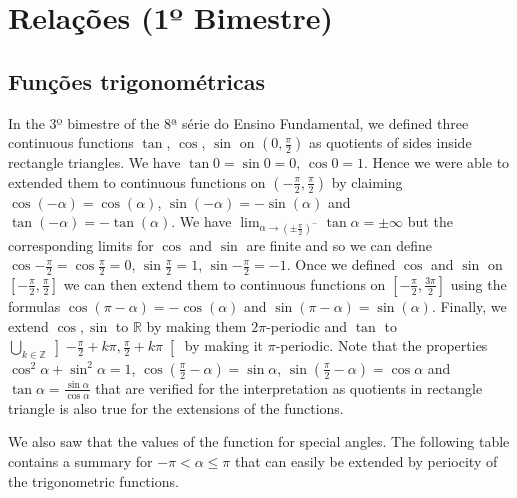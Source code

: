 \chapter{Relações (1º Bimestre)}

\section{Funções trigonométricas}

In the 3º bimestre of the 8ª série do Ensino Fundamental, we defined three
continuous functions $\tan$, $\cos$, $\sin$ on $(0,\frac{\pi}{2})$ as quotients
of sides inside rectangle triangles. We have ${\tan 0} = {\sin 0} = 0$,
${\cos 0} = 1$. Hence we were able to extended them to continuous functions on
$(-\frac{\pi}{2},\frac{\pi}{2})$ by claiming
$\cos{(-\alpha)} = \cos{(\alpha)}$, $\sin{(-\alpha)} = -\sin{(\alpha)}$ and
$\tan{(-\alpha)} = -\tan{(\alpha)}$.
We have $\lim_{\alpha \rightarrow {\left(\pm\frac{\pi}{2}\right)}^-} \tan \alpha =
\pm\infty$ but the corresponding limits for $\cos$ and $\sin$ are finite and
so we can define $\cos {-\frac{\pi}{2}} = \cos {\frac{\pi}{2}} = 0$,
$\sin {\frac{\pi}{2}} = 1$, $\sin {-\frac{\pi}{2}} = -1$.
Once we defined $\cos$ and $\sin$ on
$\left[-\frac{\pi}{2}, \frac{\pi}{2}\right]$ we can then extend them to
continuous functions on $\left[-\frac{\pi}{2}, \frac{3\pi}{2}\right]$
using the formulas $\cos{(\pi-\alpha)} = -\cos{(\alpha)}$ and
$\sin{(\pi-\alpha)} = \sin{(\alpha)}$. Finally, we extend $\cos, \sin$ to
$\mathbb R$ by making them $2\pi$-periodic and $\tan$ to
$\bigcup_{k \in \mathbb Z}
\left]{-\frac{\pi}{2} + k\pi}, {\frac{\pi}{2} +k\pi} \right[$ by making it
$\pi$-periodic.
    Note that the properties $\cos^2 \alpha + \sin^2 \alpha = 1$,
    $\cos\left(\frac{\pi}{2} - \alpha\right) = \sin \alpha$,
    $\sin\left(\frac{\pi}{2} - \alpha\right) = \cos \alpha$ and
$\tan \alpha = \frac{\sin \alpha}{\cos \alpha}$ that are verified for the
interpretation as quotients in rectangle triangle is also true for the
extensions of the functions.

We also saw that the values of the function for special angles. The following
table contains a summary for $-\pi < \alpha \leq \pi$ that can easily be
extended by periocity of the trigonometric functions.

